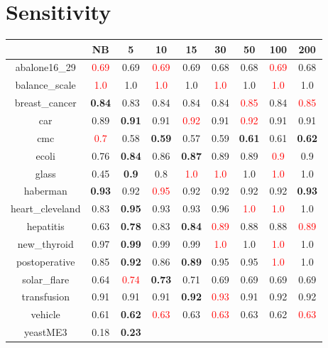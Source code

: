\documentclass{article}%
\begin{document}
\section*{Sensitivity}%
\begin{tabular}{c|cccccccc}%
\hline%
&NB&5&10&15&30&50&100&200\\%
\hline%
abalone16\_29&\textcolor{red}{ 
0.69
}&0.69&\textcolor{red}{ 
0.69
}&0.69&0.68&0.68&\textcolor{red}{ 
0.69
}&0.68\\%
\hline%
balance\_scale&\textcolor{red}{ 
1.0
}&1.0&\textcolor{red}{ 
1.0
}&1.0&\textcolor{red}{ 
1.0
}&1.0&\textcolor{red}{ 
1.0
}&1.0\\%
\hline%
breast\_cancer&\textbf{0.84}&0.83&0.84&0.84&0.84&\textcolor{red}{ 
0.85
}&0.84&\textcolor{red}{ 
0.85
}\\%
\hline%
car&0.89&\textbf{0.91}&0.91&\textcolor{red}{ 
0.92
}&0.91&\textcolor{red}{ 
0.92
}&0.91&0.91\\%
\hline%
cmc&\textcolor{red}{ 
0.7
}&0.58&\textbf{0.59}&0.57&0.59&\textbf{0.61}&0.61&\textbf{0.62}\\%
\hline%
ecoli&0.76&\textbf{0.84}&0.86&\textbf{0.87}&0.89&0.89&\textcolor{red}{ 
0.9
}&0.9\\%
\hline%
glass&0.45&\textbf{0.9}&0.8&\textcolor{red}{ 
1.0
}&\textcolor{red}{ 
1.0
}&1.0&\textcolor{red}{ 
1.0
}&1.0\\%
\hline%
haberman&\textbf{0.93}&0.92&\textcolor{red}{ 
0.95
}&0.92&0.92&0.92&0.92&\textbf{0.93}\\%
\hline%
heart\_cleveland&0.83&\textbf{0.95}&0.93&0.93&0.96&\textcolor{red}{ 
1.0
}&\textcolor{red}{ 
1.0
}&1.0\\%
\hline%
hepatitis&0.63&\textbf{0.78}&0.83&\textbf{0.84}&\textcolor{red}{ 
0.89
}&0.88&0.88&\textcolor{red}{ 
0.89
}\\%
\hline%
new\_thyroid&0.97&\textbf{0.99}&0.99&0.99&\textcolor{red}{ 
1.0
}&1.0&\textcolor{red}{ 
1.0
}&1.0\\%
\hline%
postoperative&0.85&\textbf{0.92}&0.86&\textbf{0.89}&0.95&0.95&\textcolor{red}{ 
1.0
}&1.0\\%
\hline%
solar\_flare&0.64&\textcolor{red}{ 
0.74
}&\textbf{0.73}&0.71&0.69&0.69&0.69&0.69\\%
\hline%
transfusion&0.91&0.91&0.91&\textbf{0.92}&\textcolor{red}{ 
0.93
}&0.91&0.92&0.92\\%
\hline%
vehicle&0.61&\textbf{0.62}&\textcolor{red}{ 
0.63
}&0.63&\textcolor{red}{ 
0.63
}&0.63&0.62&\textcolor{red}{ 
0.63
}\\%
\hline%
yeastME3&0.18&\textbf{0.23}&\textcolor{red}{ 
}
\end{tabular}
\end{document}
